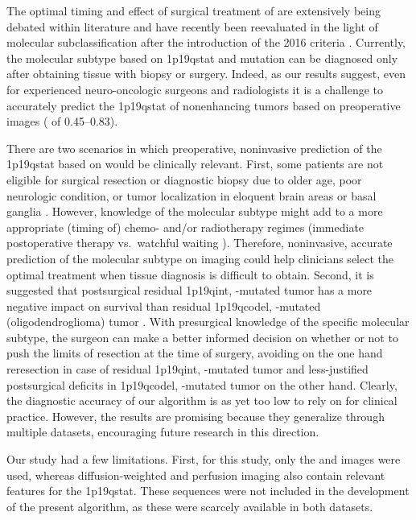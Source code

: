 The optimal timing and effect of surgical treatment of  are extensively being debated within literature and have recently been reevaluated in the light of molecular subclassification after the introduction of the  2016 criteria \autocite{wijnenga2017impact, clark2019extent, jakola2017surgical, jiang2017biopsy}.
Currently, the molecular subtype based on \acl{1p19qstat} and  mutation can be diagnosed only after obtaining tissue with biopsy or surgery.
Indeed, as our results suggest, even for experienced neuro-oncologic surgeons and radiologists it is a challenge to accurately predict the \acl{1p19qstat} of nonenhancing \glspl{tumor} based on preoperative  images ( of \numrange{0.45}{0.83}).

There are two scenarios in which preoperative, noninvasive prediction of the \acl{1p19qstat} based on  would be clinically relevant.
First, some patients are not eligible for surgical resection or diagnostic biopsy due to older age, poor neurologic condition, or \gls{tumor} localization in eloquent brain areas or basal ganglia \autocite{jiang2017biopsy}.
However, knowledge of the molecular  subtype might add to a more appropriate (timing of) chemo- and/or radiotherapy regimes (immediate postoperative therapy vs.\ watchful waiting \autocite{ricard2007dynamic}).
Therefore, noninvasive, accurate prediction of the molecular subtype on imaging could help clinicians select the optimal treatment when tissue diagnosis is difficult to obtain.
Second, it is suggested that postsurgical residual \acl{1p19qint}, -mutated \gls{tumor} has a more negative impact on survival than residual \acl{1p19qcodel}, -mutated (oligodendroglioma) \gls{tumor} \autocite{wijnenga2017impact, clark2019extent}.
With presurgical knowledge of the specific molecular subtype, the surgeon can make a better informed decision on whether or not to push the limits of resection at the time of surgery, avoiding on the one hand reresection in case of residual \acl{1p19qint}, -mutated \gls{tumor} and less-justified postsurgical deficits in \acl{1p19qcodel}, -mutated \gls{tumor} on the other hand.
Clearly, the diagnostic accuracy of our algorithm is as yet too low to rely on for clinical practice.
However, the results are promising because they generalize through multiple datasets, encouraging future research in this direction.

Our study had a few limitations.
First, for this study, only the  and  images were used, whereas diffusion-weighted and perfusion imaging also contain relevant features for the \acl{1p19qstat}.
These sequences were not included in the development of the present algorithm, as these were scarcely available in both datasets.

